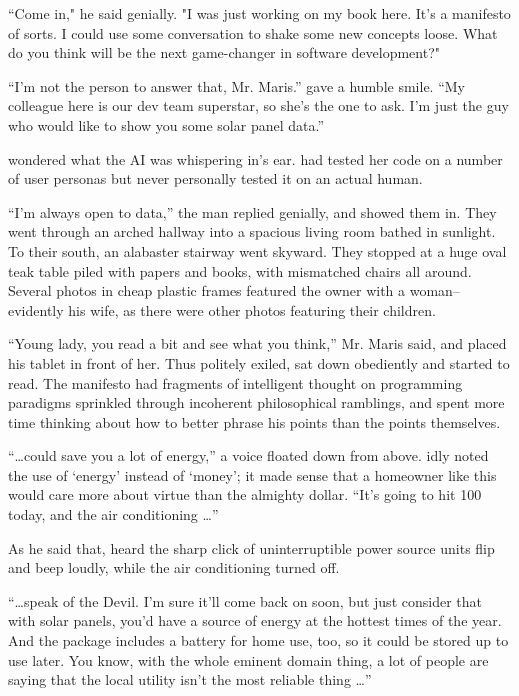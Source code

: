``Come in," he said genially. "I was just working on my book here. It's a manifesto of sorts. I could use some conversation to shake some new concepts loose. What do you think will be the next game-changer in software development?"

``I'm not the person to answer that, Mr. Maris.'' \energyJerk{} gave a humble smile. ``My colleague here is our dev team superstar, so she's the one to ask. I'm just the guy who would like to show you some solar panel data.''

{\protag} wondered what the AI was whispering in\energyJerk{}'s ear. {\protag} had tested her code on a number of user personas but never personally tested it on an actual human.

``I'm always open to data,'' the man replied genially, and showed them in. They went through an arched hallway into a spacious living room bathed in sunlight. To their south, an alabaster stairway went skyward. They stopped at a huge oval teak table piled with papers and books, with mismatched chairs all around. Several photos in cheap plastic frames featured the owner with a woman--evidently his wife, as there were other photos featuring their children.

``Young lady, you read a bit and see what you think,'' Mr. Maris said, and placed his tablet in front of her. Thus politely exiled, {\protag} sat down obediently and started to read. The manifesto had fragments of intelligent thought on programming paradigms sprinkled through incoherent philosophical ramblings, and {\protag} spent more time thinking about how to better phrase his points than the points themselves.

``\dots could save you a lot of energy,'' a voice floated down from above. {\protag} idly noted the use of `energy' instead of `money'; it made sense that a homeowner like this would care more about virtue than the almighty dollar. ``It's going to hit 100 today, and the air conditioning \dots''

As he said that, {\protag} heard the sharp click of uninterruptible power source units flip and beep loudly, while the air conditioning turned off.

``\dots speak of the Devil. I'm sure it'll come back on soon, but just consider that with solar panels, you'd have a source of energy at the hottest times of the year. And the package includes a battery for home use, too, so it could be stored up to use later. You know, with the whole eminent domain thing, a lot of people are saying that the local utility isn't the most reliable thing \dots''


